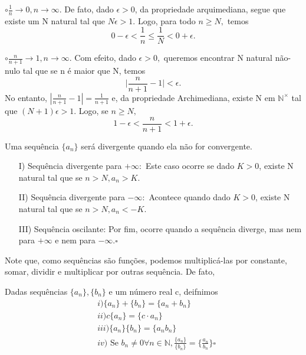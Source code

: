 \documentclass[Analysis/analysis_notes.tex]{subfiles}
\begin{document}
\begin{example}
	$\circ{}\frac{1}{n}\rightarrow0, n\rightarrow\infty$. De fato, dado $\epsilon > 0$, da propriedade arquimediana, segue que
	existe um N natural tal que $N\epsilon > 1.$ Logo, para todo $n\geq{N},$ temos
	$$
		0 - \epsilon < \frac{1}{n}\leq{\frac{1}{N}} < 0 + \epsilon.
	$$

	$\circ \frac{n}{n+1}\rightarrow 1, n\rightarrow\infty$. Com efeito, dado $\epsilon > 0,$ queremos encontrar N natural n\~ao-nulo tal que
	se n \'e maior que N, temos
	$$
		\biggl|\frac{n}{n+1} - 1\biggr| < \epsilon.
	$$
	No entanto, $|\frac{n}{n+1}-1| = \frac{1}{n+1}$ e, da propriedade Archimediana, existe N em $\mathbb{N}^{\times}$ tal que
	$(N+1)\epsilon > 1$. Logo, se $n\geq{N},$
	$$
		1 - \epsilon < \frac{n}{n+1} < 1 + \epsilon.
	$$
\end{example}
\begin{def*}
	Uma sequ\^encia $\{a_{n}\}$ ser\'a divergente quando ela n\~ao for convergente.
	\begin{itemize}
		\item[I)] Sequ\^encia divergente para $+\infty:$ Este caso ocorre se dado $K > 0$, existe N natural tal que se $n > N,
			      a_{n} > K.$
		\item[II)] Sequ\^encia divergente para $-\infty:$ Acontece quando dado $K > 0$, existe N natural tal que se $n > N,
			      a_{n} < -K.$
		\item[III)]Sequ\^encia oscilante: Por fim, ocorre quando a sequ\^encia diverge, mas nem para $+\infty$ e nem para $-\infty.\square$
	\end{itemize}
\end{def*}
Note que, como sequ\^encias s\~ao fun\c c\~oes, podemos multiplic\'a-las por constante, somar, dividir e multiplicar por outras sequ\^encia. De fato,
\begin{def*}
	Dadas sequ\^encias $\{a_{n}\}, \{b_{n}\}$ e um n\'umero real c, deifnimos
	\begin{align*}
		 & i) \{a_{n}\} + \{b_{n}\} = \{a_{n} + b_{n}\}                                                                               \\
		 & ii) c\{a_{n}\} = \{c \cdot a_{n}\}                                                                                         \\
		 & iii) \{a_{n}\}\{b_{n}\} = \{a_{n}b_{n}\}                                                                                   \\
		 & iv) \text{ Se }b_{n}\neq0\forall n\in \mathbb{N}, \frac{\{a_{n}\}}{\{b_{n}\}} = \biggl\{\frac{a_{n}}{b_{n}}\biggr\}\square
	\end{align*}
\end{def*}
\end{document}
